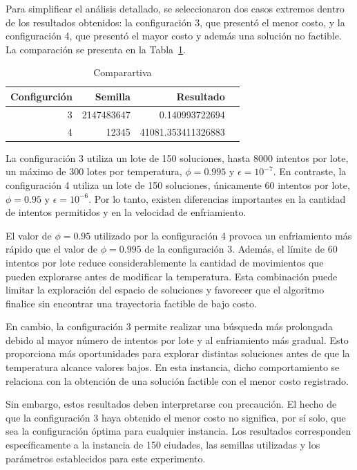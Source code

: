 \documentclass[12pt,a4paper]{article}
\begin{document}
Para simplificar el análisis detallado, se seleccionaron dos casos extremos dentro de los resultados obtenidos: la configuración 3, que presentó el menor costo, y la configuración 4, que presentó el mayor costo y además una solución no factible. La comparación se presenta en la Tabla~\ref{tab:comparación1}.

\begin{table}[H]
    \centering
    \caption{Comparartiva}
    \label{tab:comparación1}
    \begin{tabular}{rrrr}
        \toprule
        Configurción & Semilla & Resultado  \\
        \midrule
        3 & 2147483647 & 0.140993722694  \\
        4 & 12345 & 41081.353411326883 \\
        \bottomrule
    \end{tabular}
\end{table}

La configuración 3 utiliza un lote de 150 soluciones, hasta 8000 intentos por lote, un máximo de 300 lotes por temperatura, $\phi=0.995$ y $\epsilon=10^{-7}$. En contraste, la configuración 4 utiliza un lote de 150 soluciones, únicamente 60 intentos por lote, $\phi=0.95$ y $\epsilon=10^{-6}$. Por lo tanto, existen diferencias importantes en la cantidad de intentos permitidos y en la velocidad de enfriamiento.

El valor de $\phi=0.95$ utilizado por la configuración 4 provoca un enfriamiento más rápido que el valor de $\phi=0.995$ de la configuración 3. Además, el límite de 60 intentos por lote reduce considerablemente la cantidad de movimientos que pueden explorarse antes de modificar la temperatura. Esta combinación puede limitar la exploración del espacio de soluciones y favorecer que el algoritmo finalice sin encontrar una trayectoria factible de bajo costo.

En cambio, la configuración 3 permite realizar una búsqueda más prolongada debido al mayor número de intentos por lote y al enfriamiento más gradual. Esto proporciona más oportunidades para explorar distintas soluciones antes de que la temperatura alcance valores bajos. En esta instancia, dicho comportamiento se relaciona con la obtención de una solución factible con el menor costo registrado.

Sin embargo, estos resultados deben interpretarse con precaución. El hecho de que la configuración 3 haya obtenido el menor costo no significa, por sí solo, que sea la configuración óptima para cualquier instancia. Los resultados corresponden específicamente a la instancia de 150 ciudades, las semillas utilizadas y los parámetros establecidos para este experimento.
\end{document}
